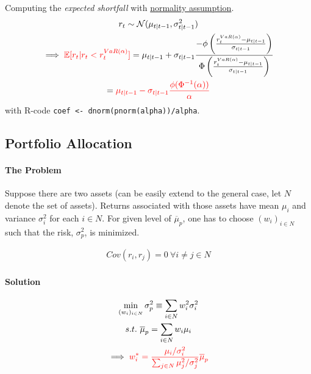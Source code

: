 \documentclass[11pt]{article}
\begin{document}
			\begin{proposition}
				Computing the \emph{expected shortfall} with \ul{normality assumption}.
				\begin{gather}
					r_t \sim \mathcal{{N}}(\mu_{t|t-1}, \sigma_{t|t-1}^2) \\
					\implies \textcolor{red}{\mathbb{E}[{r_t|r_t < r_t^{VaR(\textcolor{red}{\alpha})}}]}  = \mu_{t|t-1} + \sigma_{t|t-1} 
					\frac{-\phi \left( 
						\frac{r_t^{VaR(\alpha)} - \mu_{t|t-1}}{\sigma_{t|t-1}}
					\right)}
					{\Phi \left(
						\frac{r_t^{VaR(\alpha)} - \mu_{t|t-1}}{\sigma_{t|t-1}} 
					\right)}\\
					= \textcolor{red}{\mu_{t|t-1} - \sigma_{t|t-1} \frac{\phi(\Phi^{-1}(\alpha))}{\alpha}}
				\end{gather}
				with R-code \texttt{coef <- dnorm(pnorm(alpha))/alpha}.
			\end{proposition}
		
		\subsection{Portfolio Allocation}
			\paragraph{The Problem}Suppose there are two assets (can be easily extend to the general case, let $N$ denote the set of assets). Returns associated with those assets have mean $\mu_i$ and variance $\sigma_i^2$ for each $i \in N$. For given level of $\overline{\mu}_p$, one has to choose $(w_i)_{i \in N}$ such that the risk, $\sigma^2_p$, is minimized.
			
			\begin{assumption}
				\begin{gather}
					Cov(r_i, r_j) = 0\ \forall i \neq j \in N
				\end{gather}
			\end{assumption}
			
			\paragraph{Solution}
			\begin{gather}
				\min_{(w_i)_{i \in N}} \sigma_p^2 \equiv \sum_{i \in N} w_i^2 \sigma_i^2 \\
				s.t.\ \overline{\mu}_p = \sum_{i \in N} w_i \mu_i \\
				\implies \textcolor{red}{w_i^* = \frac{
					\mu_i/\sigma_i^2
				}{
					\sum_{j \in N} \mu_j^2/\sigma_j^2
				}\overline{\mu}_p}
			\end{gather}
			
\end{document}
